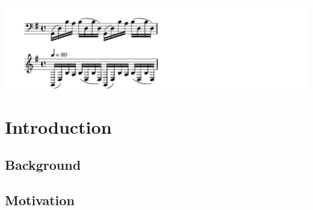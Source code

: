 \begin{savequote}[10pc]
{%
\parindent 0pt
\ifx\preLilyPondExample \undefined
\else
  \expandafter\preLilyPondExample
\fi
\def\lilypondbook{}%
\includegraphics[width=3.5\textwidth]{images/bachPrelude}
\ifx\postLilyPondExample \undefined
\else
  \expandafter\postLilyPondExample
\fi
}
\end{savequote}
\chapter{Introduction}
\minitoc

\section{Background}
\section{Motivation}


